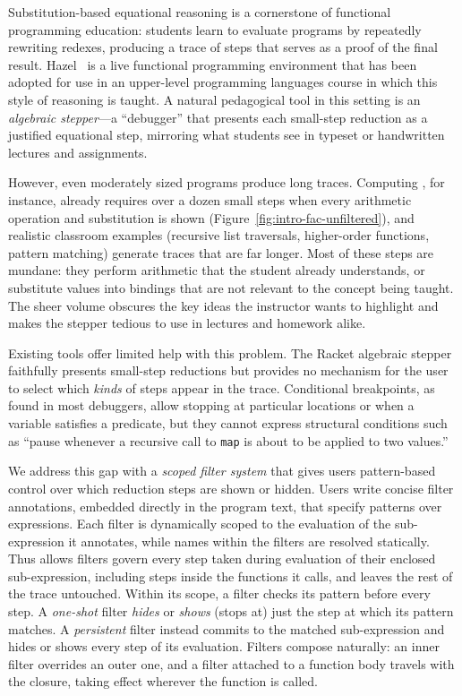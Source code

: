 Substitution-based equational reasoning is a cornerstone of functional
programming education: students learn to evaluate programs by
repeatedly rewriting redexes, producing a trace of steps that serves
as a proof of the final result. Hazel~\cite{omar2017hazelnut} is a
live functional programming environment that has been adopted for use
in an upper-level programming languages course in which this style of
reasoning is taught. A natural pedagogical tool in this setting is an
\emph{algebraic stepper}---a ``debugger'' that presents each small-step
reduction as a justified equational step, mirroring what students see
in typeset or handwritten lectures and assignments.

However, even moderately sized programs produce long traces. Computing
, for instance, already requires over a dozen small steps
when every arithmetic operation and substitution is shown
(Figure~\ref{fig:intro-fac-unfiltered}), and realistic classroom
examples (recursive list traversals, higher-order functions, pattern
matching) generate traces that are far longer. Most of these steps
are mundane: they perform arithmetic that the student already
understands, or substitute values into bindings that are not relevant
to the concept being taught. The sheer volume obscures the key ideas
the instructor wants to highlight and makes the stepper tedious to use
in lectures and homework alike.

Existing tools offer limited help with this problem. The Racket algebraic stepper~\cite{clements2001stepper}
faithfully presents small-step reductions but provides no mechanism
for the user to select which \emph{kinds} of steps appear in the
trace. Conditional breakpoints, as found in most debuggers, allow
stopping at particular locations or when a variable satisfies a
predicate, but they cannot express structural conditions such as
``pause whenever a recursive call to \texttt{map} is about to be
applied to two values.''

We address this gap with a \emph{scoped filter system} that gives
users pattern-based control over which reduction steps are shown or
hidden. Users write concise filter annotations, embedded directly
in the program text, that specify patterns over expressions. Each
filter is dynamically scoped to the evaluation of the sub-expression
it annotates, while names within the filters are resolved statically.
Thus allows filters govern every step taken during evaluation of their
enclosed sub-expression, including steps
inside the functions it calls, and leaves the rest of the trace
untouched. Within its scope, a filter checks its pattern before every
step. A \emph{one-shot} filter \emph{hides} or \emph{shows} (stops at)
just the step at which its pattern matches. A \emph{persistent} filter
instead commits to the matched sub-expression and hides or shows every
step of its evaluation. Filters compose naturally:
an inner filter overrides an outer one, and a filter attached to a
function body travels with the closure, taking effect wherever the
function is called.

